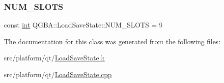 \mbox{\label{class_q_g_b_a_1_1_load_save_state_ad3b947d6fb6bbacbc567fe04ffe85e71}} 
\subsubsection{\texorpdfstring{N\+U\+M\+\_\+\+S\+L\+O\+TS}{NUM\_SLOTS}}
{\footnotesize\ttfamily const \mbox{\hyperlink{ioapi_8h_a787fa3cf048117ba7123753c1e74fcd6}{int}} Q\+G\+B\+A\+::\+Load\+Save\+State\+::\+N\+U\+M\+\_\+\+S\+L\+O\+TS = 9\hspace{0.3cm}{\ttfamily [static]}}



The documentation for this class was generated from the following files\+:\begin{DoxyCompactItemize}
\item 
src/platform/qt/\mbox{\hyperlink{_load_save_state_8h}{Load\+Save\+State.\+h}}\item 
src/platform/qt/\mbox{\hyperlink{_load_save_state_8cpp}{Load\+Save\+State.\+cpp}}\end{DoxyCompactItemize}
